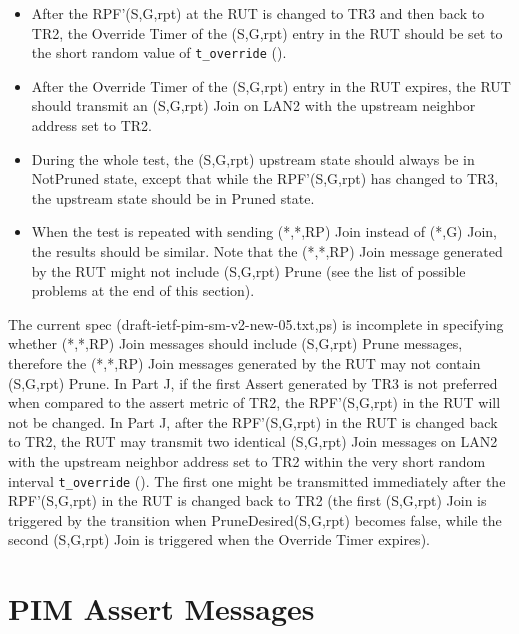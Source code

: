 \documentclass[11pt]{report}
\begin{document}
\begin{itemize}
  \item After the RPF'(S,G,rpt) at the RUT is changed to TR3 and then back to
  TR2, the Override Timer of the (S,G,rpt) entry in the RUT should be set to
  the short random value of \verb=t_override= ({\PimsmTOverride}).

  \item After the Override Timer of the (S,G,rpt) entry in the RUT expires,
  the RUT should transmit an (S,G,rpt) Join on LAN2 with the upstream neighbor
  address set to TR2.

  \item During the whole test, the (S,G,rpt) upstream state should always be
  in NotPruned state, except that while the RPF'(S,G,rpt) has changed to TR3,
  the upstream state should be in Pruned state.

  \item When the test is repeated with sending (*,*,RP) Join instead of (*,G)
  Join, the results should be similar.
  Note that the (*,*,RP) Join message generated by the RUT might not include
  (S,G,rpt) Prune (see the list of possible problems at the end of this
  section).

\end{itemize}

The current spec (draft-ietf-pim-sm-v2-new-05.{txt,ps}) is incomplete in
specifying whether (*,*,RP) Join messages should include (S,G,rpt) Prune
messages, therefore the (*,*,RP) Join messages generated by the RUT may not
contain (S,G,rpt) Prune.
In Part J, if the first Assert generated by TR3 is not preferred when compared
to the assert metric of TR2, the RPF'(S,G,rpt) in the RUT will not be changed.
In Part J, after the RPF'(S,G,rpt) in the RUT is changed back to TR2, the RUT
may transmit two identical (S,G,rpt) Join messages on LAN2 with the upstream
neighbor address set to TR2 within the very short random interval
\verb=t_override= ({\PimsmTOverride}). The first one might be transmitted
immediately after the RPF'(S,G,rpt) in the RUT is changed back to TR2 (the
first (S,G,rpt) Join is triggered by the transition when PruneDesired(S,G,rpt)
becomes false, while the second (S,G,rpt) Join is triggered when the Override
Timer expires).



\chapter{PIM Assert Messages}
\end{document}
